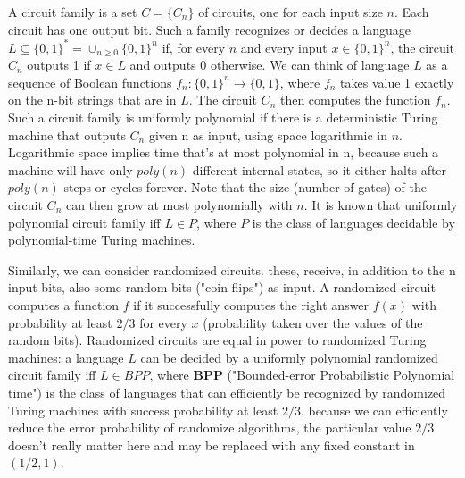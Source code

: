 A circuit family is a set $C=\{C_n\}$ of circuits, one for each input size $n$. Each circuit has one output bit. Such a family recognizes or decides a language $L \subseteq \{0,1\}^*=\cup_{n\geq 0} \{0,1\}^n$ if, for every $n$ and every input $x \in \{0,1\}^n$, the circuit $C_n$ outputs 1 if $x \in L$ and outputs 0 otherwise. We can think of language $L$ as a sequence of Boolean functions $f_n:\{0,1\}^n \rightarrow \{0,1\}$, where $f_n$ takes value 1 exactly on the n-bit strings that are in $L$. The circuit $C_n$ then computes the function $f_n$. Such a circuit family is uniformly polynomial if there is a deterministic Turing machine that outputs $C_n$ given n as input, using space logarithmic in $n$. Logarithmic space implies time that's at most polynomial in n, because such a machine will have only $poly(n)$ different internal states, so it either halts after $poly(n)$ steps or cycles forever. Note that the size (number of gates) of the circuit $C_n$ can then grow at most polynomially with $n$. It is known that uniformly polynomial circuit family iff $L\in P$, where $P$ is the class of languages decidable by polynomial-time Turing machines.

Similarly, we can consider randomized circuits. these, receive, in addition to the n input bits, also some random bits ("coin flips") as input. A randomized circuit computes a function $f$ if it successfully computes the right answer $f(x)$ with probability at least $2/3$ for every $x$ (probability taken over the values of the random bits). Randomized circuits are equal in power to randomized Turing machines: a language $L$ can be decided by a uniformly polynomial randomized circuit family iff $L \in BPP$, where $\mathbf{BPP}$ ("Bounded-error Probabilistic Polynomial time") is the class of languages that can efficiently be recognized by randomized Turing machines with success probability at least $2/3$. because we can efficiently reduce the error probability of randomize algorithms, the particular value $2/3$ doesn't really matter here and may be replaced with any fixed constant in $(1/2,1)$.







\chapterreferences
